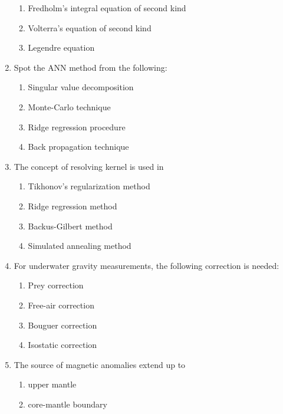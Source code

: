 \documentclass[journal,12pt,onecolumn,fleqn]{IEEEtran}
\theoremstyle{remark}
\theoremstyle{remark}
\begin{document}
\begin{enumerate}[label=Q.\arabic*.,font=\bfseries, start = 21]
\begin{enumerate}
                \item Fredholm's integral equation of second kind
                \item Volterra's equation of second kind
                \item Legendre equation                
            \end{enumerate}
    \item Spot the ANN method from the following: \hfill{} 
            \begin{enumerate}
                \item Singular value decomposition
                \item Monte-Carlo technique
                \item Ridge regression procedure
                \item Back propagation technique                
            \end{enumerate}
    \item The concept of resolving kernel is used in \hfill{} 
            \begin{enumerate}
                \item Tikhonov's regularization method
                \item Ridge regression method
                \item Backus-Gilbert method
                \item Simulated annealing method                
            \end{enumerate}
    \item For underwater gravity measurements, the following correction is needed: \hfill{} 
            \begin{enumerate}
                \item Prey correction
                \item Free-air correction
                \item Bouguer correction
                \item Isostatic correction                
            \end{enumerate}
    \item The source of magnetic anomalies extend up to \hfill{} 
            \begin{enumerate}
                \item upper mantle
                \item core-mantle boundary

\end{enumerate}
\end{enumerate}
\end{document}

